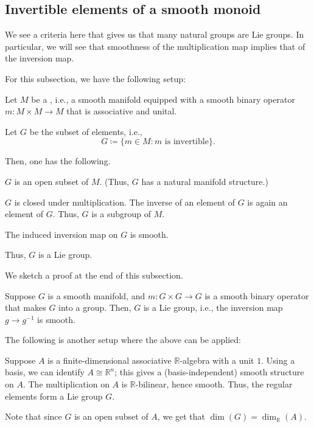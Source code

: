 \documentclass[12pt]{article}
\begin{document}
\subsection{Invertible elements of a smooth monoid}

We see a criteria here that gives us that many natural groups are Lie groups.
In particular, we will see that smoothness of the multiplication map implies that of the inversion map.

For this subsection, we have the following setup:

\begin{tcolorbox}
	Let $M$ be a , i.e., a smooth manifold equipped with a smooth binary operator $m \colon M \times M \to M$ that is associative and unital.

	Let $G$ be the subset of  elements, i.e.,
	\begin{equation*} 
		G \coloneqq \{m \in M : m \text{ is invertible}\}.
	\end{equation*}
\end{tcolorbox}

Then, one has the following.

\begin{thm} \label{thm:lie-monoid-invertible-subgroup}
	$G$ is an open subset of $M$. (Thus, $G$ has a natural manifold structure.)

	$G$ is closed under multiplication. The inverse of an element of $G$ is again an element of $G$. 
	Thus, $G$ is a subgroup of $M$.

	The induced inversion map on $G$ is smooth. 

	Thus, $G$ is a Lie group.
\end{thm}
We sketch a proof at the end of this subsection.

\begin{cor} \label{cor:inversion-automatically-smooth}
	Suppose $G$ is a smooth manifold, and $m \colon G \times G \to G$ is a smooth binary operator that makes $G$ into a group. \newline
	Then, $G$ is a Lie group, i.e., the inversion map $g \to g^{-1}$ is smooth.
\end{cor}

The following is another setup where the above can be applied:

\begin{rem}
	Suppose $A$ is a finite-dimensional associative $\mathbb{R}$-algebra with a unit $1$. 
	Using a basis, we can identify $A \cong \mathbb{R}^{n}$; this gives a (basis-independent) smooth structure on $A$. 
	The multiplication on $A$ is $\mathbb{R}$-bilinear, hence smooth. Thus, the regular elements form a Lie group $G$.

	Note that since $G$ is an open subset of $A$, we get that $\dim(G) = \dim_{\mathbb{R}}(A)$.
\end{rem}
\end{document}
